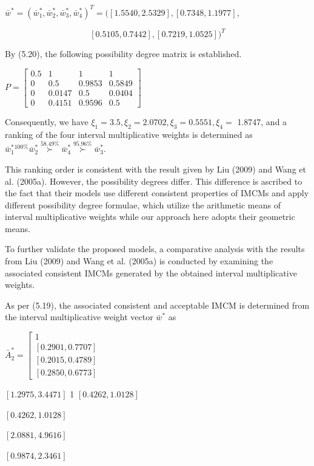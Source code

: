 \documentclass[10pt]{article}
\begin{document}
$\bar{w}^{*}=\left(\bar{w}_{1}^{*}, \bar{w}_{2}^{*}, \bar{w}_{3}^{*}, \bar{w}_{4}^{*}\right)^{T}=([1.5540,2.5329],[0.7348,1.1977]$,

$$
[0.5105,0.7442],[0.7219,1.0525])^{T}
$$

By (5.20), the following possibility degree matrix is established.

$P=\left[\begin{array}{cccc}0.5 & 1 & 1 & 1 \\ 0 & 0.5 & 0.9853 & 0.5849 \\ 0 & 0.0147 & 0.5 & 0.0404 \\ 0 & 0.4151 & 0.9596 & 0.5\end{array}\right]$

Consequently, we have $\xi_{1}=3.5, \xi_{2}=2.0702, \xi_{3}=0.5551, \xi_{4}=$ 1.8747, and a ranking of the four interval multiplicative weights is determined as $\bar{w}_{1}^{*}{ }^{100 \%} \bar{w}_{2}^{*} \stackrel{58.49 \%}{\succ} \bar{w}_{4}^{*} \stackrel{95.96 \%}{\succ} \bar{w}_{3}^{*}$.

This ranking order is consistent with the result given by Liu (2009) and Wang et al. (2005a). However, the possibility degrees differ. This difference is ascribed to the fact that their models use different consistent properties of IMCMs and apply different possibility degree formulae, which utilize the arithmetic means of interval multiplicative weights while our approach here adopts their geometric means.

To further validate the proposed models, a comparative analysis with the results from Liu (2009) and Wang et al. (2005a) is conducted by examining the associated consistent IMCMs generated by the obtained interval multiplicative weights.

As per (5.19), the associated consistent and acceptable IMCM is determined from the interval multiplicative weight vector $\bar{w}^{*}$ as

$\bar{A}_{2}^{*}=\left[\begin{array}{c}1 \\ {[0.2901,0.7707]} \\ {[0.2015,0.4789]} \\ {[0.2850,0.6773]}\end{array}\right.$

$[1.2975,3.4471]$
1
$[0.4262,1.0128]$

$[0.4262,1.0128]$

$[2.0881,4.9616]$

$[0.9874,2.3461]$
\end{document}
